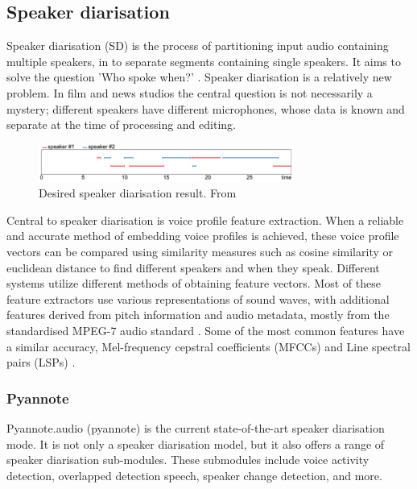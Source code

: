 \documentclass[twoside]{uva-inf-bachelor-thesis}
\begin{document}
\subsection{Speaker diarisation}
Speaker diarisation (SD) is the process of partitioning input audio containing multiple speakers, in to separate segments containing single speakers. It aims to solve the question 'Who spoke when?' \cite{sahidullah2019speed}. Speaker diarisation is a relatively new problem. In film and news studios the central question is not necessarily a mystery; different speakers have different microphones, whose data is known and separate at the time of processing and editing. 

\begin{figure}[h]
    \centering
    \includegraphics[width=0.75\textwidth]{images/speakerdiaroutput2.png}
    \caption{Desired speaker diarisation result. From \cite{bredin2023pyannote}}
    \label{fig:sdo}
\end{figure}

Central to speaker diarisation is voice profile feature extraction. When a reliable and accurate method of embedding voice profiles is achieved, these voice profile vectors can be compared using similarity measures such as cosine similarity or euclidean distance to find different speakers and when they speak. Different systems utilize different methods of obtaining feature vectors. Most of these feature extractors use various representations of sound waves, with additional features derived from pitch information and audio metadata, mostly from the standardised MPEG-7 audio standard \cite{kotti2008speaker, lu2002speaker}. Some of the most common features have a similar accuracy, Mel-frequency cepstral coefficients
(MFCCs) \cite{gook04} and Line spectral pairs (LSPs) \cite{lu2002speaker}. 

\subsubsection{Pyannote}\label{sec:pyannote}
 Pyannote.audio (pyannote) is the current state-of-the-art speaker diarisation mode. It is not only a speaker diarisation model, but it also offers a range of speaker diarisation sub-modules. These submodules include voice activity detection, overlapped detection speech, speaker change detection, and more. \cite{bredin2020pyannote, bredin2023pyannote}
\end{document}
